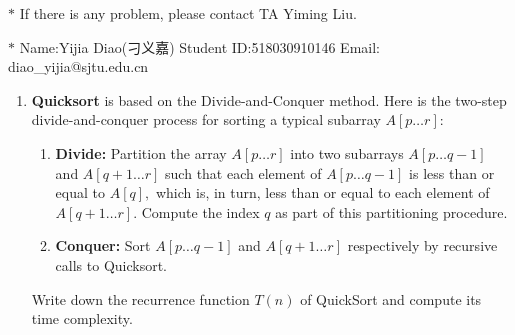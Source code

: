 \documentclass[12pt,a4paper,UTF8]{article}
\theoremstyle{definition}
\begin{document}
\noindent

\noindent{}
\begin{center}
\footnotesize{\color{red}$*$ If there is any problem, please contact TA Yiming Liu.}

\footnotesize{\color{blue}$*$ Name:Yijia Diao(刁义嘉)  \quad Student ID:518030910146 \quad Email: diao\_yijia@sjtu.edu.cn}
\end{center}

\begin{enumerate}
    \item
    \textbf{Quicksort} is based on the Divide-and-Conquer method. Here is the two-step divide-and-conquer process for sorting a typical subarray $A[p \ldots r]$:
    \begin{enumerate}

    	\item
    	\textbf{Divide:} Partition the array $A[p \ldots r]$ into two subarrays $A[p \ldots q-1]$ and $A[q+1 \ldots r]$ such that each element of $A[p \ldots q-1]$ is less than or equal to $A[q],$ which is, in turn, less than or equal to each element of $A[q+1 \ldots r].$ Compute the index $q$ as part of this partitioning procedure.
    	
    	\item
    	\textbf{Conquer:} Sort $A[p \ldots q-1]$ and $A[q+1 \ldots r]$ respectively by recursive calls to Quicksort.
    	
    \end{enumerate}
    Write down the recurrence function $T(n)$ of QuickSort and compute its time complexity.


\end{enumerate}
\end{document}

